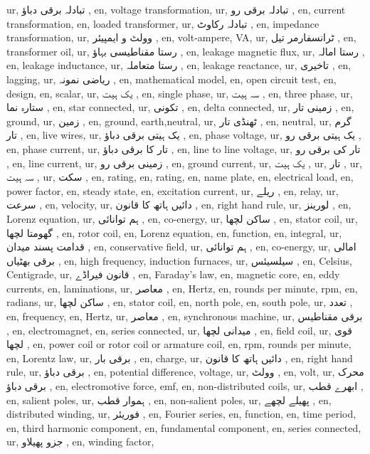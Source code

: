 ur, تبادلہ برقی دباؤ ,
en, voltage transformation,
ur, تبادلہ برقی رو ,
en, current transformation,
en, loaded transformer,
ur, تبادلہ رکاوٹ ,
en, impedance transformation,
ur, وولٹ و ایمپیئر ,
en, volt-ampere, VA,
ur, ٹرانسفارمر تیل ,
en, transformer oil,
ur, رستا مقناطیسی بہاؤ ,
en, leakage magnetic flux,
ur, رستا امالہ ,
en, leakage inductance,
ur, رستا متعاملہ ,
en, leakage reactance,
ur, تاخیری ,
en, lagging,
ur, ریاضی نمونہ ,
en, mathematical model,
en, open circuit test,
en, design,
en, scalar,
ur, یک ہیت ,
en, single phase,
ur, سہ ہیت ,
en, three phase,
ur, ستارہ نما ,
en, star connected,
ur, تکونی ,
en, delta connected,
ur, زمینی تار ,
en, ground,
ur, زمین ,
en, ground, earth,neutral,
ur, ٹھنڈی تار ,
en, neutral,
ur, گرم تار ,
en, live wires,
ur, یک ہیتی برقی دباؤ ,
en, phase voltage,
ur, یک ہیتی برقی رو ,
en, phase current,
ur, تار کا برقی دباؤ ,
en, line to line voltage,
ur, تار کی برقی رو ,
en, line current,
ur, زمینی برقی رو ,
en, ground current,
ur, یک ہیت ,
ur, تار ,
ur, سہ ہیت ,
ur, سکت ,
en, rating,
en, rating,
en, name plate,
en, electrical load,
en, power factor,
en, steady state,
en, excitation current,
ur, ریلے ,
en, relay,
ur, سرعت ,
en, velocity,
ur, دائیں ہاتھ کا قانون ,
en, right hand rule,
ur, لورینز ,
en, Lorenz equation,
ur,  ہم توانائی ,
en, co-energy,
ur, ساکن لچھا ,
en, stator coil,
ur, گھومتا لچھا ,
en, rotor coil,
en, Lorenz equation,
en, function,
en, integral,
ur, قدامت پسند میدان ,
en, conservative field,
ur, ہم توانائی ,
en, co-energy,
ur, امالی برقی بھٹیاں ,
en, high frequency, induction furnaces,
ur, سیلسیئس ,
en, Celsius, Centigrade,
ur, قانون فیراڈے ,
en, Faraday's law,
en, magnetic core,
en, eddy currents,
en, laminations,
ur, معاصر ,
en, Hertz,
en, rounds per minute, rpm,
en, radians,
ur, ساکن لچھا ,
en, stator coil,
en, north pole,
en, south pole,
ur, تعدد ,
en, frequency,
en, Hertz,
ur, معاصر ,
en, synchronous machine,
ur, برقی مقناطیس ,
en, electromagnet,
en, series connected,
ur, میدانی لچھا ,
en, field coil,
ur, قوی لچھا ,
en, power coil or rotor coil or armature coil,
en, rpm, rounds per minute,
en, Lorentz law,
ur, برقی بار ,
en, charge,
ur, دائیں ہاتھ کا قانون ,
en, right hand rule,
ur, برقی دباؤ ,
en, potential difference, voltage,
ur, وولٹ ,
en, volt,
ur, محرک برقی دباؤ ,
en, electromotive force, emf,
en, non-distributed coils,
ur, ابھرے قطب ,
en, salient poles,
ur, ہموار قطب ,
en, non-salient poles,
ur, پھیلے لچھے ,
en, distributed winding,
ur, فوریئر ,
en, Fourier series,
en, function,
en, time period,
en, third harmonic component,
en, fundamental component,
en, series connected,
ur, جزو پھیلاو ,
en, winding factor,
